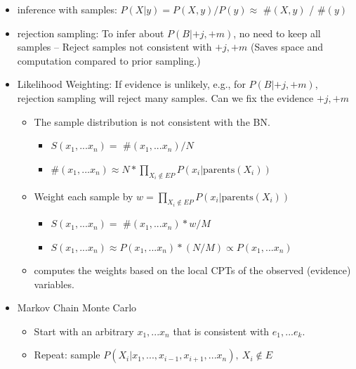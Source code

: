 \documentclass[10pt]{article}
\begin{document}
\begin{itemize}[label=\(\star\), leftmargin=1em, itemsep=-0.3em]
    \item inference with samples: $P(X|y) = P(X, y)/P(y) \approx $ \#$(X,y)$ / \#$(y)$
    \item rejection sampling: To infer about $ P(B | +j, +m)$, no need to keep all samples -- Reject samples not consistent with $+j, +m$ (Saves space and computation compared to prior sampling.)
    \item Likelihood Weighting: If evidence is unlikely, e.g., for $P(B | +j, +m)$, rejection sampling will reject many samples. Can we fix the evidence $+j, +m$

          \begin{itemize}[label=\(\star\), leftmargin=5em, itemsep=-0.2em]
              \item The sample distribution is not consistent with the BN.
                    \begin{itemize}[label=\(\star\), leftmargin=5em, itemsep=-0.2em]
                        \item[] $S(x_1, ... x_n) =$ \#$(x_1, ... x_n) / N$
                        \item[] \#$(x_1, ... x_n)\approx  N * \prod_{X_i \notin EP } P(x_i|\text{parents}(X_i))$
                    \end{itemize}
              \item Weight each sample by $w= \prod_{X_i \notin EP } P(x_i|\text{parents}(X_i))$
                    \begin{itemize}[label=\(\star\), leftmargin=5em, itemsep=-0.2em]
                        \item[] $S(x_1, ... x_n) =$ \#$(x_1, ... x_n) * w/M$
                        \item[]  $S(x_1, ... x_n) \approx P(x_1, ... x_n) *(N/M) \propto  P(x_1, ... x_n)$
                    \end{itemize}
              \item computes the weights based on the local CPTs of the observed (evidence) variables.
          \end{itemize}
    \item Markov Chain Monte Carlo
          \begin{itemize}[label=\(\star\), leftmargin=5em, itemsep=-0.2em]
              \item Start with an arbitrary $x_1, ... x_n$ that is consistent with $e_1,...e_k$.
              \item Repeat: sample  $P(X_i| x_1, ..., x_{i-1}, x_{i+1},... x_n), \ X_i \notin E$
                    \begin{itemize}[label=\(\star\), leftmargin=5em, itemsep=-0.2em]

\end{itemize}
\end{itemize}
\end{itemize}
\end{document}
